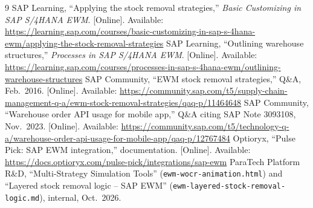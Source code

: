 \documentclass[11pt,a4paper]{article}
\begin{document}
\begin{thebibliography}{9}
 SAP Learning, ``Applying the stock removal strategies,'' \emph{Basic Customizing in SAP S/4HANA EWM}. [Online]. Available: \url{https://learning.sap.com/courses/basic-customizing-in-sap-s-4hana-ewm/applying-the-stock-removal-strategies}
 SAP Learning, ``Outlining warehouse structures,'' \emph{Processes in SAP S/4HANA EWM}. [Online]. Available: \url{https://learning.sap.com/courses/processes-in-sap-s-4hana-ewm/outlining-warehouse-structures}
 SAP Community, ``EWM stock removal strategies,'' Q\&A, Feb.~2016. [Online]. Available: \url{https://community.sap.com/t5/supply-chain-management-q-a/ewm-stock-removal-strategies/qaq-p/11464648}
 SAP Community, ``Warehouse order API usage for mobile app,'' Q\&A citing SAP Note 3093108, Nov.~2023. [Online]. Available: \url{https://community.sap.com/t5/technology-q-a/warehouse-order-api-usage-for-mobile-app/qaq-p/12767484}
 Optioryx, ``Pulse Pick: SAP EWM integration,'' documentation. [Online]. Available: \url{https://docs.optioryx.com/pulse-pick/integrations/sap-ewm}
 ParaTech Platform R\&D, ``Multi-Strategy Simulation Tools'' (\texttt{ewm-wocr-animation.html}) and ``Layered stock removal logic -- SAP EWM'' (\texttt{ewm-layered-stock-removal-logic.md}), internal, Oct.~2026.
\end{thebibliography}
\end{document}
